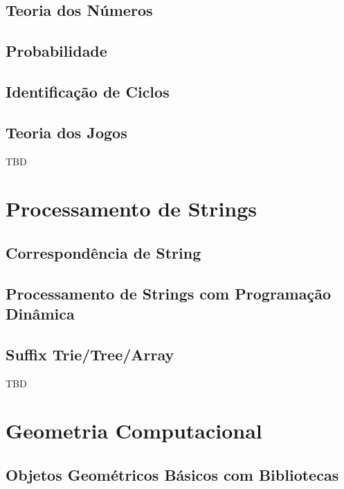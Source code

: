 \documentclass[11pt]{scrartcl}
\begin{document}
\subsection{Teoria dos Números}

\subsection{Probabilidade}

\subsection{Identificação de Ciclos}

\subsection{Teoria dos Jogos}

TBD


\section{Processamento de Strings}

\subsection{Correspondência de String}

\subsection{Processamento de Strings com Programação Dinâmica}

\subsection{Suffix Trie/Tree/Array}

TBD


\section{Geometria Computacional}

\subsection{Objetos Geométricos Básicos com Bibliotecas}
\end{document}
